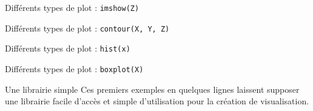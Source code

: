 \begin{frame}{Différents types de plot : \texttt{imshow(Z)}}
    \begin{minipage}[t]{0.49\linewidth}
    \end{minipage}
    \begin{minipage}[t]{0.49\linewidth}
        \vfill
    \end{minipage}
\end{frame}

\begin{frame}{Différents types de plot : \texttt{contour(X, Y, Z)}}
    \begin{minipage}[t]{0.49\linewidth}
    \end{minipage}
    \begin{minipage}[t]{0.49\linewidth}
        \vfill
    \end{minipage}
\end{frame}

\begin{frame}{Différents types de plot : \texttt{hist(x)}}
    \begin{minipage}[t]{0.49\linewidth}
    \end{minipage}
    \begin{minipage}[t]{0.49\linewidth}
        \vfill
    \end{minipage}
\end{frame}

\begin{frame}{Différents types de plot : \texttt{boxplot(X)}}
    \begin{minipage}[t]{0.49\linewidth}
    \end{minipage}
    \begin{minipage}[t]{0.49\linewidth} 
        \vfill
    \end{minipage}
\end{frame}

\begin{frame}{Une librairie simple }
    Ces premiers exemples en quelques lignes laissent supposer une librairie facile d'accès et simple d'utilisation pour la création de visualisation.

\end{frame}

